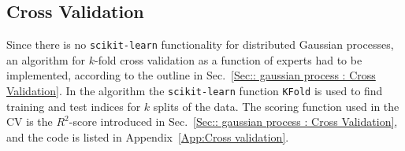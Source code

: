 \documentclass[twoside,english]{uiofysmaster}
\begin{document}
{{%

\subsection{Cross Validation}

Since there is no \verb|scikit-learn| functionality for distributed Gaussian processes, an algorithm for $k$-fold cross validation as a function of experts had to be implemented, according to the outline in Sec.~\ref{Sec:: gaussian process : Cross Validation}. In the algorithm the \verb|scikit-learn| function \verb|KFold| is used to find training and test indices for $k$ splits of the data. The scoring function used in the CV is the $R^2$-score introduced in Sec.~\ref{Sec:: gaussian process : Cross Validation}, and the code is listed in Appendix~\ref{App:Cross validation}. 



}}
\end{document}
